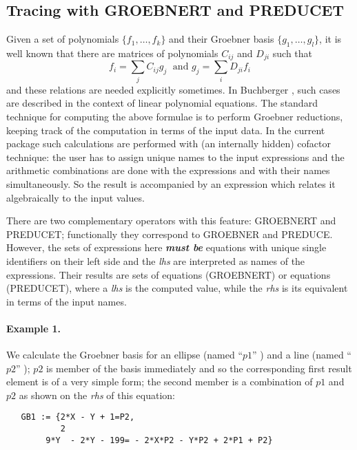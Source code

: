 \subsection{Tracing with GROEBNERT and PREDUCET}
 Given a set of polynomials $\{f_1,\ldots ,f_k\}$ and their Groebner
basis $\{g_1,\ldots ,g_l\}$, it is well known that there are matrices of
polynomials $C_{ij}$ and $D_{ji}$ such that
\[
f_i = \displaystyle{\sum\limits_j} C_{ij} g_j \;\mbox{  and  } g_j =
\displaystyle{\sum\limits_i} D_{ji} f_i
\]
and these relations are needed explicitly sometimes.
In {\sc Buchberger} \cite{BUCH85}, such cases are described in the
context of linear polynomial equations. The standard technique for
computing the above formulae is to perform
Groebner reductions, keeping track of the
computation in terms of the input data. In the current package such
calculations are performed with (an internally hidden) cofactor
technique: the user has to assign unique names to the input
expressions and the  arithmetic combinations are done with the
expressions and with their names simultaneously. So the result is
accompanied by an expression which relates it algebraically to the
input values.

There are two complementary operators with this feature: GROEBNERT
and PREDUCET; functionally they correspond to GROEBNER and PREDUCE.
However, the sets of expressions here {\it {\bf must be}} equations
with unique single identifiers on their left side and the {\it lhs} are
interpreted as names of the expressions. Their results are
sets of equations (GROEBNERT) or equations (PREDUCET), where
a {\it lhs} is the computed value, while the {\it rhs} is its equivalent
in terms of the input names.

\paragraph{Example 1.}
We calculate the Groebner basis for an ellipse (named ``$p1$'' ) and a
line (named ``$p2$'' ); $p2$ is member of the basis immediately and so
the corresponding first result element is of a very simple form; the
second member is a combination of $p1$ and $p2$ as shown on the
{\it rhs} of this equation:

\begin{verbatim}   GB1 := {2*X - Y + 1=P2,
           2
        9*Y  - 2*Y - 199= - 2*X*P2 - Y*P2 + 2*P1 + P2}
\end{verbatim}


